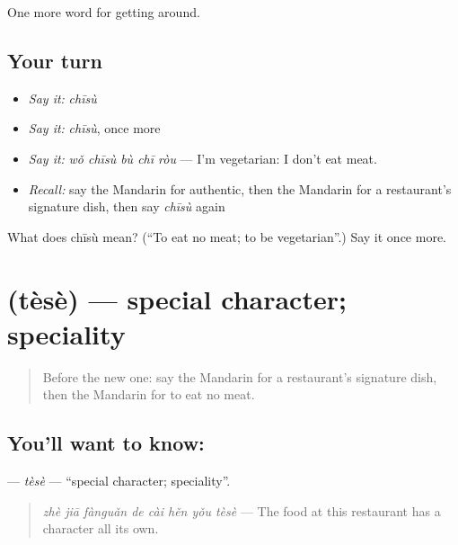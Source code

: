 \begin{grammarlens}[title={What you've built}]
One more word for getting around.
\end{grammarlens}

\subsection*{Your turn}
\begin{itemize}
\raggedright
  \item \emph{Say it:} \emph{chīsù}
  \item \emph{Say it:} \emph{chīsù}, once more
  \item \emph{Say it:} \emph{wǒ chīsù bù chī ròu} — I'm vegetarian: I don't eat meat.
  \item \emph{Recall:} say the Mandarin for authentic, then the Mandarin for a restaurant's signature dish, then say \emph{chīsù} again
\end{itemize}

\begin{tcolorbox}[breakable,colback=teal!4,colframe=teal!35!black,title={Before you move on}]
What does chīsù mean? (\textquotedblleft{}To eat no meat; to be vegetarian\textquotedblright{}.) Say it once more.
\end{tcolorbox}
\section[\texorpdfstring{\zh{特色} (tèsè)}{特色 (tèsè)}]{ (tèsè) — special character; speciality}

\label{lesson:ZH-C451-tese}



\begin{quote}
Before the new one: say the Mandarin for a restaurant's signature dish, then the Mandarin for to eat no meat.
\end{quote}

\subsection*{You'll want to know: }
\textbf{} — \emph{tèsè} — \textquotedblleft{}special character; speciality\textquotedblright{}.

\begin{quote}
\emph{zhè jiā fànguǎn de cài hěn yǒu tèsè} — The food at this restaurant has a character all its own.
\end{quote}

